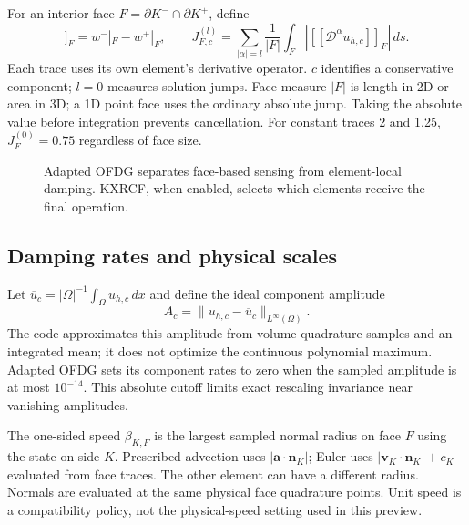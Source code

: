 For an interior face $F=\partial K^-\cap\partial K^+$, define
\begin{equation}
 [\![w]\!]_F=w^-|_F-w^+|_F,
 \qquad
 J_{F,c}^{(l)}=\sum_{|\alpha|=l}\frac1{|F|}\int_F
 \left|[\![\mathscr D^\alpha u_{h,c}]\!]_F\right|\,ds.
 \label{eq:ofdg-face-jump}
\end{equation}
Each trace uses its own element's derivative operator. $c$ identifies a
conservative component; $l=0$ measures solution jumps. Face measure $|F|$ is
length in 2D or area in 3D; a 1D point face uses the ordinary absolute jump.
Taking the absolute value before integration prevents cancellation. For
constant traces 2 and 1.25, $J_F^{(0)}=0.75$ regardless of face size.

\begin{figure}[htbp]
\centering
{}
\caption{Adapted OFDG separates face-based sensing from element-local damping.
KXRCF, when enabled, selects which elements receive the final operation.}
\label{fig:ofdg-pipeline}
\end{figure}

\subsection{Damping rates and physical scales}
Let $\overline u_c=|\Omega|^{-1}\int_\Omega u_{h,c}\,dx$ and define the ideal
component amplitude
\begin{equation}
 A_c=\|u_{h,c}-\overline u_c\|_{L^\infty(\Omega)}.
 \label{eq:ofdg-global-scale}
\end{equation}
The code approximates this amplitude from volume-quadrature samples and an
integrated mean; it does not optimize the continuous polynomial maximum.
Adapted OFDG sets its component rates to zero when the sampled amplitude is
at most $10^{-14}$. This absolute cutoff limits exact rescaling invariance
near vanishing amplitudes.

The one-sided speed $\beta_{K,F}$ is the largest sampled normal radius on
face $F$ using the state on side $K$. Prescribed advection uses
$|\boldsymbol a\cdot\boldsymbol n_K|$; Euler uses
$|\boldsymbol v_K\cdot\boldsymbol n_K|+c_K$ evaluated from face traces.
The other element can have a different radius. Normals are evaluated at the
same physical face quadrature points. Unit speed is a compatibility policy,
not the physical-speed setting used in this preview.

